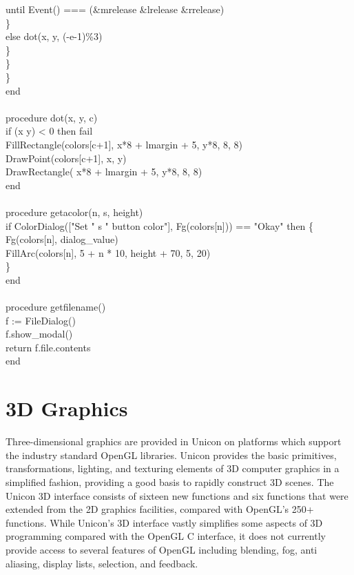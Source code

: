 {\>\>\>\>\>until Event() === (\&mrelease {\textbar} \&lrelease {\textbar} \&rrelease) \\
\>\>\>\>\>\} \\
\>\>\>\>else dot(x, y, (-e-1)\%3) \\
\>\>\>\>\} \\
\>\>\>\} \\
\>\>\} \\
end \\
\ \\
procedure dot(x, y, c) \\
\>if (x {\textbar} y) {\textless} 0 then fail \\
\>FillRectangle(colors[c+1], x*8 + lmargin + 5, y*8, 8, 8) \\
\>DrawPoint(colors[c+1], x, y) \\
\>DrawRectangle( x*8 + lmargin + 5, y*8, 8, 8) \\
end \\
\ \\
procedure getacolor(n, s, height) \\
\>if ColorDialog(["Set " {\textbar}{\textbar} s {\textbar}{\textbar} " button color"], Fg(colors[n])) == "Okay" then \{ \\
\>\>Fg(colors[n], dialog\_value) \\
\>\>FillArc(colors[n], 5 + n * 10, height + 70, 5, 20) \\
\>\>\} \\
end \\
\ \\
procedure getfilename() \\
\>f := FileDialog() \\
\>f.show\_modal() \\
\>return f.file.contents \\
end
}

\section{3D Graphics}

Three-dimensional graphics are provided in Unicon on platforms which
support the industry standard OpenGL libraries. Unicon provides the
basic primitives, transformations, lighting, and texturing elements of
3D computer graphics in a simplified fashion, providing a good basis
to rapidly construct 3D scenes. The Unicon 3D interface consists of
sixteen new functions and six functions that were extended from the 2D
graphics facilities, compared with OpenGL's 250+ functions. While
Unicon's 3D interface vastly simplifies some aspects of 3D programming
compared with the OpenGL C interface, it does not currently provide
access to several features of OpenGL including blending, fog, anti
aliasing, display lists, selection, and feedback.

